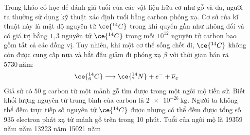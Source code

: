 \begin{ex}
	Trong khảo cổ học để đánh giá tuổi của các vật liệu hữu cơ như gỗ và da, người ta thường sử dụng kỹ thuật xác định tuổi bằng carbon phóng xạ. Cơ sở của kĩ thuật này là mật độ  nguyên tử $\ce{^{14}C}$ trong khí quyển gần như không đổi và có giá trị bằng $1,3$ nguyên tử $\ce{^{14}C}$ trong mỗi $10^{12}$ nguyên tử carbon bao gồm tất cả các đồng vị. Tuy nhiên, khi một cơ thể sống chết đi, $\ce{^{14}C}$ không còn được cung cấp nữa và bắt đầu giảm đi phóng xạ $\beta$ với thời gian bán rã $\SI{5730}{\text{năm}}$:
	$$\ce{^{14}_6C}\longrightarrow \ce{^{14}_7N}+e^{-}+\overline{\nu}_e$$
	Giả sử có $\SI{50}{\gram}$ carbon từ một mảnh gỗ tìm được trong một ngôi mộ tiền sử. Biết khối lượng nguyên tử trung bình của carbon là $\SI{2e-26}{\kilogram}$. Người ta không thể đếm trực tiếp số nguyên tử $\ce{^{14}C}$ được nhưng có thể đếm được tổng số $935$ electron phát xạ từ mảnh gỗ trên trong 10 phút. Tuổi của ngôi mộ là
	\choice
	{19359 năm}
	{ năm}
	{13223 năm}
	{15021 năm}
\end{ex}

